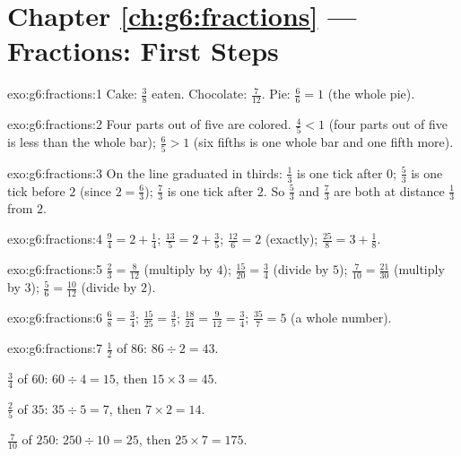\section*{Chapter \ref{ch:g6:fractions} --- Fractions: First Steps}

\begin{solution}{exo:g6:fractions:1}
Cake: $\frac38$ eaten. \quad Chocolate: $\frac{7}{12}$. \quad
Pie: $\frac66 = 1$ (the whole pie).
\end{solution}

\begin{solution}{exo:g6:fractions:2}
Four parts out of five are colored. $\frac45 < 1$ (four parts out of
five is less than the whole bar); $\frac65 > 1$ (six fifths is one
whole bar and one fifth more).
\end{solution}

\begin{solution}{exo:g6:fractions:3}
On the line graduated in thirds: $\frac13$ is one tick after $0$;
$\frac53$ is one tick before $2$ (since $2 = \frac63$); $\frac73$ is
one tick after $2$. So $\frac53$ and $\frac73$ are both at distance
$\frac13$ from $2$.
\end{solution}

\begin{solution}{exo:g6:fractions:4}
$\frac94 = 2 + \frac14$; \quad
$\frac{13}{5} = 2 + \frac35$; \quad
$\frac{12}{6} = 2$ (exactly); \quad
$\frac{25}{8} = 3 + \frac18$.
\end{solution}

\begin{solution}{exo:g6:fractions:5}
$\frac23 = \frac{8}{12}$ (multiply by $4$); \quad
$\frac{15}{20} = \frac34$ (divide by $5$); \quad
$\frac{7}{10} = \frac{21}{30}$ (multiply by $3$); \quad
$\frac56 = \frac{10}{12}$ (divide by $2$).
\end{solution}

\begin{solution}{exo:g6:fractions:6}
$\frac68 = \frac34$; \quad
$\frac{15}{25} = \frac35$; \quad
$\frac{18}{24} = \frac{9}{12} = \frac34$; \quad
$\frac{35}{7} = 5$ (a whole number).
\end{solution}

\begin{solution}{exo:g6:fractions:7}
$\frac12$ of $86$: $86 \div 2 = 43$.

$\frac34$ of $60$: $60 \div 4 = 15$, then $15 \times 3 = 45$.

$\frac25$ of $35$: $35 \div 5 = 7$, then $7 \times 2 = 14$.

$\frac{7}{10}$ of $250$: $250 \div 10 = 25$, then $25 \times 7 = 175$.
\end{solution}

